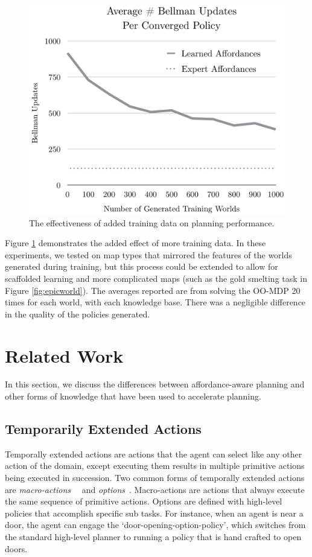 \documentclass[letterpaper]{article}
\begin{document}
\begin{figure}[b]
\centering
\includegraphics[scale=0.195]{figures/training_results.png}%
  \caption{The effectiveness of added training data on planning performance.}
  \label{fig:training_results}
\end{figure}

Figure \ref{fig:training_results} demonstrates the added effect of more training data. In these experiments, we tested on map types that mirrored the features of the worlds generated during training, but this process could be extended to allow for scaffolded learning and more complicated maps (such as the gold smelting task in Figure \ref{fig:epicworld}). The averages reported are from solving the OO-MDP 20 times for each world, with each knowledge base. There was a negligible difference in the quality of the policies generated.

\section{Related Work}
\label{sec:related-work}

In this section, we discuss the differences between
affordance-aware planning and other forms of knowledge that
have been used to accelerate planning.

\subsection{Temporarily Extended Actions}
Temporally extended actions are actions that the agent can
select like any other action of the domain, except executing them
results in multiple primitive actions being executed in
succession. Two common forms of temporally extended actions are {\em
  macro-actions}~\cite{hauskrecht98} ~and {\em options}~\cite{sutton99}. 
Macro-actions are actions that always
execute the same sequence of primitive actions. Options are defined
with high-level policies that accomplish specific sub tasks. For
instance, when an agent is near a door, the agent can engage the
`door-opening-option-policy', which switches from the standard
high-level planner to running a policy that is hand crafted to open
doors. 
\end{document}
